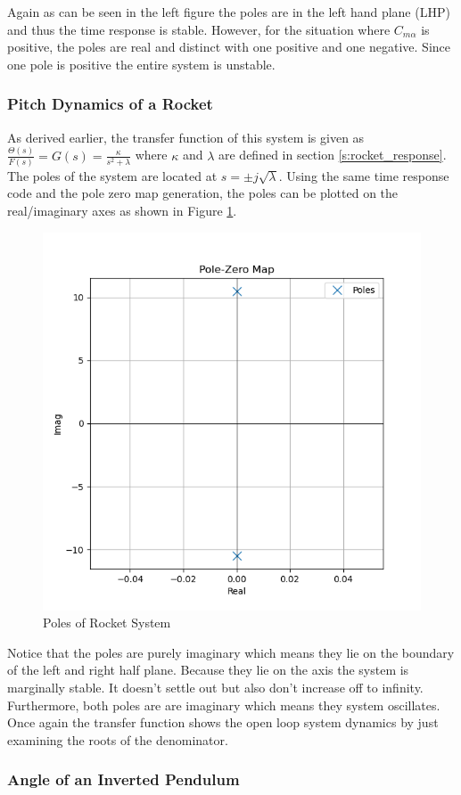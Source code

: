 Again as can be seen in the left figure the poles are in the left hand plane (LHP) and thus the time response is stable. However, for the situation where $C_{m\alpha}$ is positive, the poles are real and distinct with one positive and one negative. Since one pole is positive the entire system is unstable. 

\subsubsection{Pitch Dynamics of a Rocket}

As derived earlier, the transfer function of this system is given as $\frac{\Theta(s)}{F(s)}= G(s) = \frac{\kappa}{s^2+\lambda}$ where $\kappa$ and $\lambda$ are defined in section \ref{s:rocket_response}. The poles of the system are located at $s=\pm j\sqrt{\lambda}$. Using the same time response code and the pole zero map generation, the poles can be plotted on the real/imaginary axes as shown in Figure \ref{f:rocket_poles}.
\begin{figure}[H]
\centering
\includegraphics[width=0.48\linewidth]{Figures/rocket_poles.png}
\caption{Poles of Rocket System}
\label{f:rocket_poles}
\end{figure}
Notice that the poles are purely imaginary which means they lie on the boundary of the left and right half plane. Because they lie on the axis the system is marginally stable. It doesn't settle out but also don't increase off to infinity. Furthermore, both poles are are imaginary which means they system oscillates. Once again the transfer function shows the open loop system dynamics by just examining the roots of the denominator. 

\subsubsection{Angle of an Inverted Pendulum}

